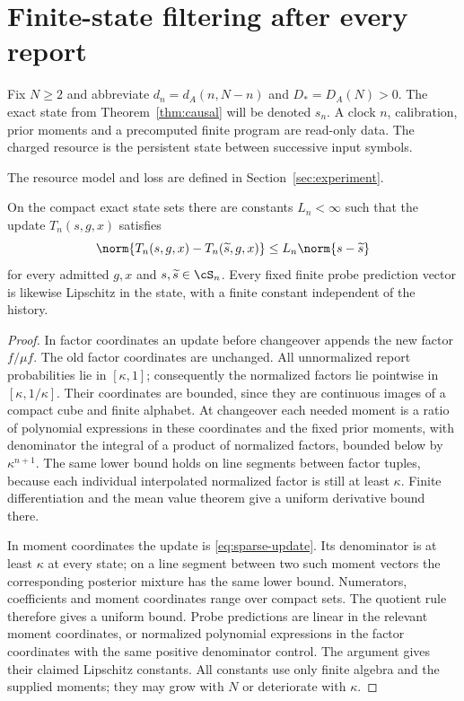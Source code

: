 \section{Finite-state filtering after every report}\label{sec:streaming}
Fix $N\ge2$ and abbreviate $d_n=d_A(n,N-n)$ and $D_*=D_A(N)>0$.
The exact state from Theorem~\ref{thm:causal} will be denoted $s_n$.
A clock $n$, calibration, prior moments and a precomputed finite program
are read-only data. The charged resource is the persistent state between
successive input symbols.

The resource model and loss are defined in Section~\ref{sec:experiment}.

\begin{lemma}\label{lem:lipschitz}
On the compact exact state sets there are constants $L_n<\infty$ such
that the update $T_n(s,g,x)$ satisfies
\[
 \norm{T_n(s,g,x)-T_n(\widetilde s,g,x)}
 \le L_n\norm{s-\widetilde s}
\]
for every admitted $g,x$ and $s,\widetilde s\in\cS_n$.
Every fixed finite probe prediction vector is likewise Lipschitz in the
state, with a finite constant independent of the history.
\end{lemma}
\begin{proof}
In factor coordinates an update before changeover appends the new factor
$f/\mu f$. The old factor coordinates are unchanged. All unnormalized
report probabilities lie in $[\kappa,1]$; consequently the normalized
factors lie pointwise in $[\kappa,1/\kappa]$. Their coordinates are bounded,
since they are continuous images of a compact cube and finite alphabet.
At changeover each needed moment is a ratio of polynomial expressions in
these coordinates and the fixed prior moments, with denominator the
integral of a product of normalized factors, bounded below by $\kappa^{n+1}$.
The same lower bound holds on line segments between factor tuples,
because each individual interpolated normalized factor is still at least
$\kappa$. Finite differentiation and the mean value theorem give a
uniform derivative bound there.

In moment coordinates the update is \eqref{eq:sparse-update}. Its
denominator is at least $\kappa$ at every state; on a line segment between
two such moment vectors the corresponding posterior mixture has the same
lower bound. Numerators, coefficients and moment coordinates range over
compact sets. The quotient rule therefore gives a uniform bound. Probe
predictions are linear in the relevant moment coordinates, or normalized
polynomial expressions in the factor coordinates with the same positive
denominator control. The argument gives their claimed Lipschitz constants.
All constants use only finite algebra and the supplied moments; they may
grow with $N$ or deteriorate with $\kappa$.
\end{proof}

